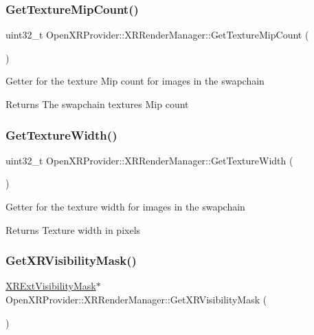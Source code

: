 \subsubsection{\texorpdfstring{GetTextureMipCount()}{GetTextureMipCount()}}
{\footnotesize\ttfamily uint32\+\_\+t Open\+X\+R\+Provider\+::\+X\+R\+Render\+Manager\+::\+Get\+Texture\+Mip\+Count (\begin{DoxyParamCaption}{ }\end{DoxyParamCaption})\hspace{0.3cm}{\ttfamily [inline]}}

Getter for the texture Mip count for images in the swapchain \begin{DoxyReturn}{Returns}
The swapchain textures\textquotesingle{} Mip count 
\end{DoxyReturn}
\mbox{\label{class_open_x_r_provider_1_1_x_r_render_manager_a6d9fe3b04d4786f66455cac3bd9fa115}} 
\subsubsection{\texorpdfstring{GetTextureWidth()}{GetTextureWidth()}}
{\footnotesize\ttfamily uint32\+\_\+t Open\+X\+R\+Provider\+::\+X\+R\+Render\+Manager\+::\+Get\+Texture\+Width (\begin{DoxyParamCaption}{ }\end{DoxyParamCaption})\hspace{0.3cm}{\ttfamily [inline]}}

Getter for the texture width for images in the swapchain \begin{DoxyReturn}{Returns}
Texture width in pixels 
\end{DoxyReturn}
\mbox{\label{class_open_x_r_provider_1_1_x_r_render_manager_a7bcc0021dd457e08fe53f7841d0c7c66}} 
\subsubsection{\texorpdfstring{GetXRVisibilityMask()}{GetXRVisibilityMask()}}
{\footnotesize\ttfamily \mbox{\hyperlink{class_open_x_r_provider_1_1_x_r_ext_visibility_mask}{X\+R\+Ext\+Visibility\+Mask}}$\ast$ Open\+X\+R\+Provider\+::\+X\+R\+Render\+Manager\+::\+Get\+X\+R\+Visibility\+Mask (\begin{DoxyParamCaption}{ }\end{DoxyParamCaption})\hspace{0.3cm}{\ttfamily [inline]}}


